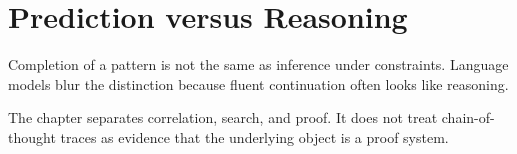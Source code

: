 \chapter{Prediction versus Reasoning}
\label{ch:prediction-vs-reasoning}

Completion of a pattern is not the same as inference under constraints. Language models blur the distinction because fluent continuation often looks like reasoning.

The chapter separates correlation, search, and proof. It does not treat chain-of-thought traces as evidence that the underlying object is a proof system.
